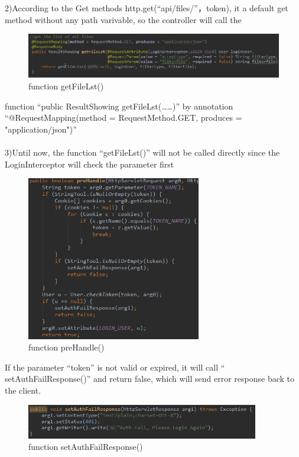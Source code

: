 \documentclass[12pt,a4]{article}
\begin{document}
2)According to the Get methods http.get(“api/files/”，token), it a default get method without any path varivable, so the controller will call the 
\begin{figure}[h]%
		\centering  %
		\includegraphics[width=5in]{figure/second}  	%
		\caption{function getFileLst()}   %
		\end{figure}
function “public ResultShowing getFileLst(……)” by annotation “@RequestMapping(method = RequestMethod.GET, produces = "application/json")”
\\
\\
3)Until now, the function “getFileLst()” will not be called directly since the LoginInterceptor will check the parameter first
\begin{figure}[h]%
		\centering  %
		\includegraphics[width=3in]{figure/third}  	%
		\caption{function preHandle()}   %
		\end{figure}
If the parameter “token” is not valid or expired, it will call “ setAuthFailResponse()” and return false, which will send error response back to the client.
\begin{figure}[h]%
		\centering  %
		\includegraphics[width=4in]{figure/third2}  	%
		\caption{function setAuthFailResponse()}   %
		\end{figure}
\end{document}
